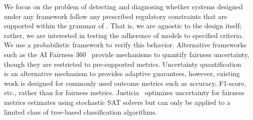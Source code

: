 We focus on the problem of detecting and diagnosing whether systems designed under any framework follow any prescribed regulatory constraints that are supported within the grammar of \AVOIRmethodname{}.
That is, we are agnostic to the design itself; rather, we are interested in testing the adherence of models to specified criteria.
We use a probabilistic framework to verify this behavior.
Alternative frameworks such as the AI Fairness 360~\citep{bellamy2019AI}  provide mechanisms to quantify fairness uncertainty, though they are restricted to pre-supported metrics.
Uncertainty quantification~\citep{ghosh2021uncertainty,ginart2022mldemon} is an alternative mechanism to provides adaptive guarantees, however, existing work is designed for commonly used outcome metrics such as accuracy, F1-score, etc., rather than for fairness metrics. 
Justicia~\citep{ghosh2021justicia} optimizes uncertainty for fairness metrics estimates using stochastic SAT solvers but can only be applied to a limited class of tree-based classification algorithms.

